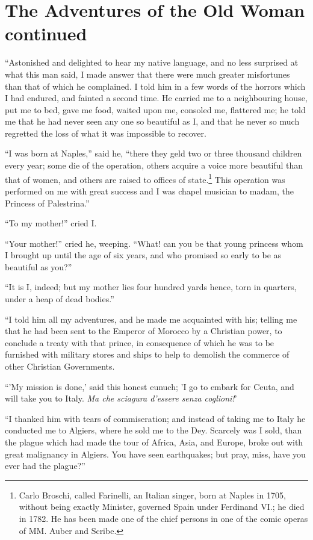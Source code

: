 \vspace{1cm}
\chapter{The Adventures of the Old Woman continued}
\vspace{-1cm}
``Astonished and delighted to hear my native language, and no less surprised at what this man said, I made answer that there were much greater misfortunes than that of which he complained. I told him in a few words of the horrors which I had endured, and fainted a second time. He carried me to a neighbouring house, put me to bed, gave me food, waited upon me, consoled me, flattered me; he told me that he had never seen any one so beautiful as I, and that he never so much regretted the loss of what it was impossible to recover.

``I was born at Naples,'' said he, ``there they geld two or three thousand children every year; some die of the operation, others acquire a voice more beautiful than that of women, and others are raised to offices of state.\footnote{Carlo Broschi, called Farinelli, an Italian singer, born at Naples in 1705, without being exactly Minister, governed Spain under Ferdinand VI.; he died in 1782. He has been made one of the chief persons in one of the comic operas of MM. Auber and Scribe.} This operation was performed on me with great success and I was chapel musician to madam, the Princess of Palestrina.''

``To my mother!'' cried I.

``Your mother!'' cried he, weeping. ``What! can you be that young princess whom I brought up until the age of six years, and who promised so early to be as beautiful as you?''

``It is I, indeed; but my mother lies four hundred yards hence, torn in quarters, under a heap of dead bodies.''

``I told him all my adventures, and he made me acquainted with his; telling me that he had been sent to the Emperor of Morocco by a Christian power, to conclude a treaty with that prince, in consequence of which he was to be furnished with military stores and ships to help to demolish the commerce of other Christian Governments.

``'My mission is done,' said this honest eunuch; 'I go to embark for Ceuta, and will take you to Italy. \textit{Ma che sciagura d'essere senza coglioni!}'

``I thanked him with tears of commiseration; and instead of taking me to Italy he conducted me to Algiers, where he sold me to the Dey. Scarcely was I sold, than the plague which had made the tour of Africa, Asia, and Europe, broke out with great malignancy in Algiers. You have seen earthquakes; but pray, miss, have you ever had the plague?''

